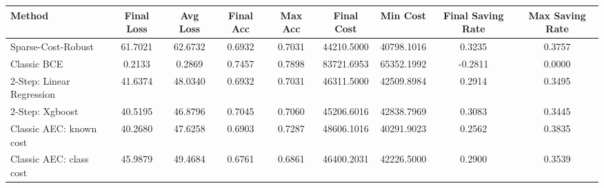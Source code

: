\begin{tabular}{lcccccccc}
\toprule
Method & Final Loss & Avg Loss & Final Acc & Max Acc & Final Cost & Min Cost & Final Saving Rate & Max Saving Rate \\
\midrule
Sparse-Cost-Robust & 61.7021 & 62.6732 & 0.6932 & 0.7031 & 44210.5000 & 40798.1016 & 0.3235 & 0.3757 \\
Classic BCE & 0.2133 & 0.2869 & 0.7457 & 0.7898 & 83721.6953 & 65352.1992 & -0.2811 & 0.0000 \\
2-Step: Linear Regression & 41.6374 & 48.0340 & 0.6932 & 0.7031 & 46311.5000 & 42509.8984 & 0.2914 & 0.3495 \\
2-Step: Xgboost & 40.5195 & 46.8796 & 0.7045 & 0.7060 & 45206.6016 & 42838.7969 & 0.3083 & 0.3445 \\
Classic AEC: known cost & 40.2680 & 47.6258 & 0.6903 & 0.7287 & 48606.1016 & 40291.9023 & 0.2562 & 0.3835 \\
Classic AEC: class cost & 45.9879 & 49.4684 & 0.6761 & 0.6861 & 46400.2031 & 42226.5000 & 0.2900 & 0.3539 \\
\bottomrule
\end{tabular}
